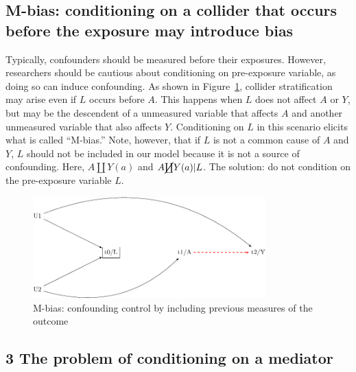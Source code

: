 \documentclass[
  singlecolumn]{report}
\begin{document}
\hypertarget{m-bias-conditioning-on-a-collider-that-occurs-before-the-exposure-may-introduce-bias}{%
\subsection{M-bias: conditioning on a collider that occurs before the
exposure may introduce
bias}\label{m-bias-conditioning-on-a-collider-that-occurs-before-the-exposure-may-introduce-bias}}

Typically, confounders should be measured before their exposures.
However, researchers should be cautious about conditioning on
pre-exposure variable, as doing so can induce confounding. As shown in
Figure~\ref{fig-m-bias}, collider stratification may arise even if \(L\)
occurs before \(A\). This happens when \(L\) does not affect \(A\) or
\(Y\), but may be the descendent of a unmeasured variable that affects
\(A\) and another unmeasured variable that also affects \(Y\).
Conditioning on \(L\) in this scenario elicits what is called
``M-bias.'' Note, however, that if \(L\) is not a common cause of \(A\)
and \(Y\), \(L\) should not be included in our model because it is not a
source of confounding. Here, \(A \coprod Y(a)\) and
\(A \cancel{\coprod} Y(a)| L\). The solution: do not condition on the
pre-exposure variable \(L\).

\begin{figure}

{\centering \includegraphics[width=0.8\textwidth,height=\textheight]{causal-dags_files/figure-pdf/fig-m-bias-1.pdf}

}

\caption{\label{fig-m-bias}M-bias: confounding control by including
previous measures of the outcome}

\end{figure}

\hypertarget{the-problem-of-conditioning-on-a-mediator}{%
\subsection{3 The problem of conditioning on a
mediator}\label{the-problem-of-conditioning-on-a-mediator}}
\end{document}

